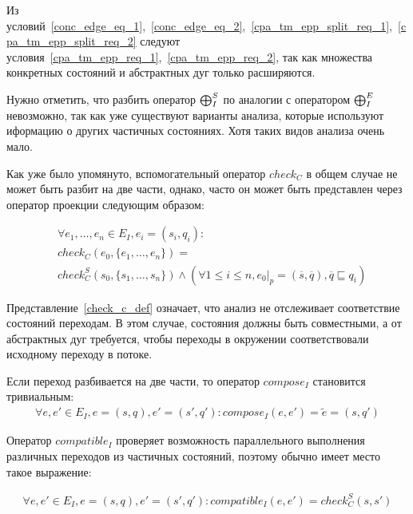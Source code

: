 Из условий~\ref{conc_edge_eq_1},~\ref{conc_edge_eq_2},~\ref{cpa_tm_epp_split_req_1},~\ref{cpa_tm_epp_split_req_2} следуют условия~\ref{cpa_tm_epp_req_1},~\ref{cpa_tm_epp_req_2}, так как множества конкретных состояний и абстрактных дуг только расширяются.

Нужно отметить, что разбить оператор $\mathrel{\bigoplus}^S_I$ по аналогии с оператором $\mathrel{\bigoplus}^E_I$ невозможно, так как уже существуют варианты анализа, которые используют иформацию о других частичных состояниях. 
Хотя таких видов анализа очень мало. 

Как уже было упомянуто, вспомогательный оператор $check_C$ в общем случае не может быть разбит на две части, однако, часто он может быть представлен через оператор проекции следующим образом: 

\begin{equation}
\label{default_check_c_def}
\begin{aligned}
& \forall e_1, \dots, e_n \in E_I, e_i=(s_i,q_i): \\
& check_C(e_0, \{e_1, \dots, e_n\}) = \\
& check^S_C(s_0, \{s_1, \dots, s_n\}) \land (\forall 1 \le i \le n, e_0|_p = (\overline{s}, \overline{q}), \overline{q} \sqsubseteq q_i)
\end{aligned}
\end{equation}

Представление~\ref{check_c_def} означает, что анализ не отслеживает соответствие состояний переходам. 
В этом случае, состояния должны быть совместными, а от абстрактных дуг требуется, чтобы переходы в окружении соответствовали исходному переходу в потоке. 

Если переход разбивается на две части, то оператор $compose_I$ становится тривиальным:
\begin{equation}
\label{default_compose_def}
\begin{aligned}
\forall e, e' \in E_I, e = (s, q), e' = (s', q'): compose_I(e, e') = \tilde{e} = (s, q')
\end{aligned}
\end{equation}

Оператор $compatible_I$ проверяет возможность параллельного выполнения различных переходов из частичных состояний, поэтому обычно имеет место такое выражение:

\begin{equation}
\label{default_compatible_def}
\begin{aligned}
\forall e, e' \in E_I, e = (s, q), e' = (s', q'): compatible_I(e, e') = check^S_C(s, {s'})
\end{aligned}
\end{equation}


